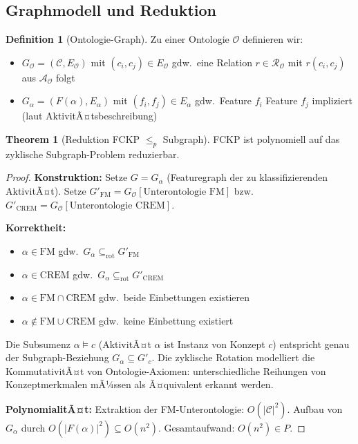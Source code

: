 ﻿\documentclass[a4paper,12pt]{article}
\theoremstyle{definition}
\newtheorem{definition}{Definition}[section]
\newtheorem{theorem}{Theorem}[section]
\begin{document}
\subsection{Graphmodell und Reduktion}

\begin{definition}[Ontologie-Graph]
\label{def:og}
Zu einer Ontologie $\mathcal{O}$ definieren wir:
\begin{itemize}
    \item $G_{\mathcal{O}} = (\mathcal{C}, E_{\mathcal{O}})$ mit $(c_i, c_j) \in E_{\mathcal{O}}$
          gdw.\ eine Relation $r \in \mathcal{R}_{\mathcal{O}}$ mit $r(c_i, c_j)$ aus $\mathcal{A}_{\mathcal{O}}$ folgt
    \item $G_{\alpha} = (F(\alpha), E_{\alpha})$ mit $(f_i, f_j) \in E_{\alpha}$
          gdw.\ Feature $f_i$ Feature $f_j$ impliziert (laut AktivitÃ¤tsbeschreibung)
\end{itemize}
\end{definition}

\begin{theorem}[Reduktion FCKP $\leq_p$ Subgraph]
\label{thm:fckp-red}
FCKP ist polynomiell auf das zyklische Subgraph-Problem reduzierbar.
\end{theorem}

\begin{proof}
\textbf{Konstruktion:}
Setze $G = G_{\alpha}$ (Featuregraph der zu klassifizierenden AktivitÃ¤t).
Setze $G'_{\mathrm{FM}} = G_{\mathcal{O}}[\text{Unterontologie FM}]$ bzw.\
$G'_{\mathrm{CREM}} = G_{\mathcal{O}}[\text{Unterontologie CREM}]$.

\textbf{Korrektheit:}
\begin{itemize}
    \item $\alpha \in \mathrm{FM}$ gdw.\ $G_{\alpha} \subseteq_{\mathrm{rot}} G'_{\mathrm{FM}}$
    \item $\alpha \in \mathrm{CREM}$ gdw.\ $G_{\alpha} \subseteq_{\mathrm{rot}} G'_{\mathrm{CREM}}$
    \item $\alpha \in \mathrm{FM} \cap \mathrm{CREM}$ gdw.\ beide Einbettungen existieren
    \item $\alpha \notin \mathrm{FM} \cup \mathrm{CREM}$ gdw.\ keine Einbettung existiert
\end{itemize}
Die Subsumenz $\alpha \models c$ (AktivitÃ¤t $\alpha$ ist Instanz von Konzept $c$)
entspricht genau der Subgraph-Beziehung $G_{\alpha} \subseteq G'_c$.
Die zyklische Rotation modelliert die KommutativitÃ¤t von Ontologie-Axiomen:
unterschiedliche Reihungen von Konzeptmerkmalen mÃ¼ssen als Ã¤quivalent erkannt werden.

\textbf{PolynomialitÃ¤t:}
Extraktion der FM-Unterontologie: $O(|\mathcal{C}|^2)$.
Aufbau von $G_{\alpha}$ durch $O(|F(\alpha)|^2) \subseteq O(n^2)$.
Gesamtaufwand: $O(n^2) \in P$.
\end{proof}
\end{document}
